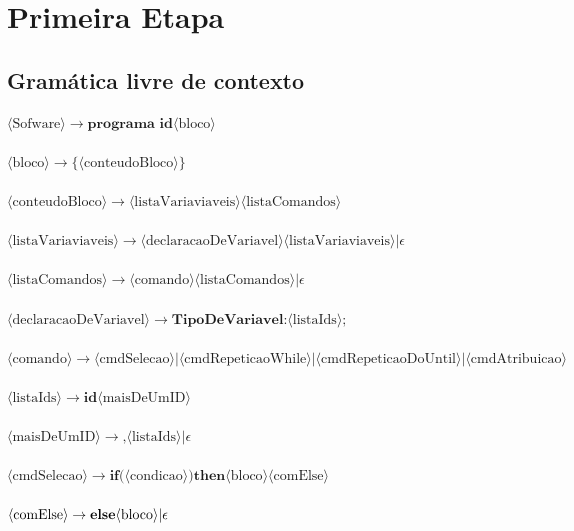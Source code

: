 \documentclass[11pt]{article}
\begin{document}
\section*{Primeira Etapa}

\subsection*{Gramática livre de contexto}


$\langle \text{Sofware} \rangle \rightarrow \textbf{programa } \textbf{id} \langle\text{bloco}\rangle$\\\\
$\langle\text{bloco}\rangle \rightarrow \textbf{\{} \langle\text{conteudoBloco}\rangle \textbf{\}}$\\\\
$\langle\text{conteudoBloco}\rangle \rightarrow \langle\text{listaVariaviaveis}\rangle \langle\text{listaComandos}\rangle$\\\\
$\langle\text{listaVariaviaveis}\rangle \rightarrow \langle\text{declaracaoDeVariavel}\rangle \langle\text{listaVariaviaveis}\rangle | \epsilon $\\\\
$\langle\text{listaComandos}\rangle \rightarrow \langle\text{comando}\rangle \langle\text{listaComandos}\rangle | \epsilon $\\\\
$\langle\text{declaracaoDeVariavel}\rangle  \rightarrow \textbf{TipoDeVariavel} \textbf{:} \langle\text{listaIds}\rangle \textbf{;}$\\\\
$\langle\text{comando}\rangle \rightarrow \langle\text{cmdSelecao}\rangle | \langle\text{cmdRepeticaoWhile}\rangle | \langle\text{cmdRepeticaoDoUntil}\rangle | \langle\text{cmdAtribuicao}\rangle$\\\\
$\langle\text{listaIds}\rangle \rightarrow \textbf{id} \langle\text{maisDeUmID} \rangle$\\\\
$\langle\text{maisDeUmID}\rangle \rightarrow \textbf{,}\langle\text{listaIds}\rangle  | \epsilon$\\\\
$\langle\text{cmdSelecao}\rangle \rightarrow \textbf{if(} \langle\text{condicao}\rangle \textbf{)then} \langle\text{bloco}\rangle \langle \text{comElse} \rangle$\\\\
$\langle \text{comElse} \rangle \rightarrow  \textbf{else} \langle\text{bloco}\rangle | \epsilon \\\\$
\end{document}
